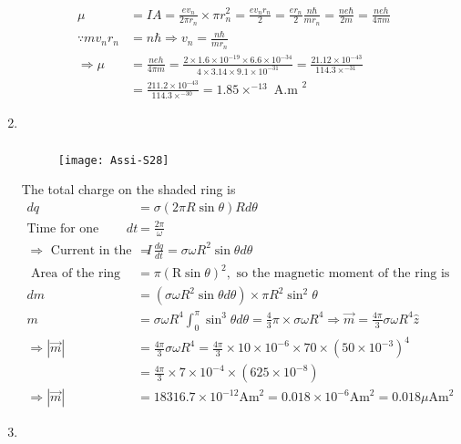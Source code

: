 \begin{enumerate}
\begin{answer}
\begin{align*}
		\mu&=I A=\frac{e v_{n}}{2 \pi r_{n}} \times \pi r_{n}^{2}=\frac{e v_{n} r_{n}}{2}=\frac{e r_{n}}{2} \frac{n \hbar}{m r_{n}}=\frac{n e \hbar}{2 m}=\frac{n e h}{4 \pi m} \quad\\ \because m v_{n} r_{n}&=n \hbar \Rightarrow v_{n}=\frac{n \hbar}{m r_{n}} \\
		\Rightarrow \mu&=\frac{n e h}{4 \pi m}=\frac{2 \times 1.6 \times 10^{-19} \times 6.6 \times 10^{-34}}{4 \times 3.14 \times 9.1 \times 10^{-31}}=\frac{21.12 \times 10^{-43}}{114.3 \times^{-31}}\\&=\frac{211.2 \times 10^{-43}}{114.3 \times^{-30}}=1.85 \times^{-13} \text { A.m }^{2}
		\end{align*}
	\end{answer}
	\item $\left. \right. $
	\begin{answer}$\left. \right. $
			\begin{figure}[H]
			\centering
			\texttt{[image: Assi-S28]}
		\end{figure}
			The total charge on the shaded ring is
		\begin{align*}
		d q&=\sigma(2 \pi R \sin \theta) R d \theta\\
		\text{Time for one revolution is }d t&=\frac{2 \pi}{\omega}\\
		\Rightarrow\text{ Current in the ring }I&=\frac{d q}{d t}=\sigma \omega R^{2} \sin \theta d \theta\\
	\text{	Area of the ring }&=\pi(\mathrm{R} \sin \theta)^{2},\text{ so the magnetic moment of the ring is}\\
		d m&=\left(\sigma \omega R^{2} \sin \theta d \theta\right) \times \pi R^{2} \sin ^{2} \theta \\
		m&=\sigma \omega R^{4} \int_{0}^{\pi} \sin ^{3} \theta d \theta=\frac{4}{3} \pi \times \sigma \omega R^{4} \Rightarrow \vec{m}=\frac{4 \pi}{3} \sigma \omega R^{4} \hat{z}\\
		\Rightarrow|\vec{m}|&=\frac{4 \pi}{3} \sigma \omega R^{4}=\frac{4 \pi}{3} \times 10 \times 10^{-6} \times 70 \times\left(50 \times 10^{-3}\right)^{4}\\&=\frac{4 \pi}{3} \times 7 \times 10^{-4} \times\left(625 \times 10^{-8}\right)\\
		\Rightarrow|\vec{m}|&=18316.7 \times 10^{-12} \mathrm{Am}^{2}=0.018 \times 10^{-6} \mathrm{Am}^{2}=0.018 \mu \mathrm{Am}^{2}
		\end{align*}
	\end{answer}
	\item $\left. \right. $

\end{enumerate}
